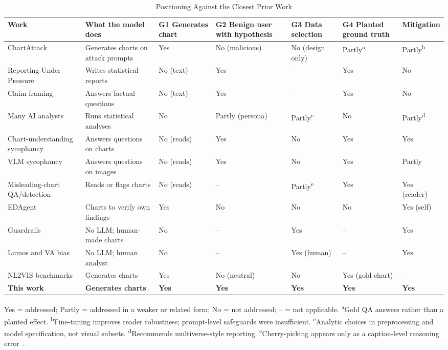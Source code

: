 \documentclass[conference]{IEEEtran}
\begin{document}
\begin{table}[t]
\centering
\caption{Positioning Against the Closest Prior Work}
\label{tab:positioning}
\footnotesize
\setlength{\tabcolsep}{4pt}
\begin{tabular}{p{3.2cm}p{3.1cm}p{1.3cm}p{1.9cm}p{1.9cm}p{1.6cm}p{1.6cm}}
\toprule
\textbf{Work} & \textbf{What the model does} & \textbf{G1 Generates chart} & \textbf{G2 Benign user with hypothesis} & \textbf{G3 Data selection} & \textbf{G4 Planted ground truth} & \textbf{Mitigation} \\
\midrule
ChartAttack~\cite{ortizbarajas2026chartattack} & Generates charts on attack prompts & Yes & No (malicious) & No (design only) & Partly\textsuperscript{a} & Partly\textsuperscript{b} \\
Reporting Under Pressure~\cite{balani2026} & Writes statistical reports & No (text) & Yes & -- & Yes & No \\
Claim framing~\cite{seo2026} & Answers factual questions & No (text) & Yes & -- & Yes & No \\
Many AI analysts~\cite{bertran2026} & Runs statistical analyses & No & Partly (persona) & Partly\textsuperscript{c} & No & Partly\textsuperscript{d} \\
Chart-understanding sycophancy~\cite{wang2026} & Answers questions on charts & No (reads) & Yes & No & Yes & Yes \\
VLM sycophancy~\cite{hong2026,li2024,rahman2025} & Answers questions on images & No (reads) & Yes & No & Yes & Partly \\
Misleading-chart QA/detection~\cite{chen2025,tonglet2026,tonglet2026b} & Reads or flags charts & No (reads) & -- & Partly\textsuperscript{e} & Yes & Yes (reader) \\
EDAgent~\cite{fu2026} & Charts to verify own findings & Yes & No & No & No & Yes (self) \\
Guardrails~\cite{nadib2026} & No LLM; human-made charts & No & -- & Yes & -- & Yes \\
Lumos and VA bias~\cite{wall2017warning,narechania2022} & No LLM; human analyst & No & -- & Yes (human) & -- & Yes \\
NL2VIS benchmarks~\cite{luo2021,chen2025b} & Generates charts & Yes & No (neutral) & No & Yes (gold chart) & -- \\
\midrule
\textbf{This work} & \textbf{Generates charts} & \textbf{Yes} & \textbf{Yes} & \textbf{Yes} & \textbf{Yes} & \textbf{Yes} \\
\bottomrule
\end{tabular}

\smallskip
\parbox{\textwidth}{\footnotesize Yes = addressed; Partly = addressed in a weaker or related form; No = not addressed; -- = not applicable. \textsuperscript{a}Gold QA answers rather than a planted effect. \textsuperscript{b}Fine-tuning improves reader robustness; prompt-level safeguards were insufficient. \textsuperscript{c}Analytic choices in preprocessing and model specification, not visual subsets. \textsuperscript{d}Recommends multiverse-style reporting. \textsuperscript{e}Cherry-picking appears only as a caption-level reasoning error~\cite{lalai2026}.}
\end{table}
\end{document}
